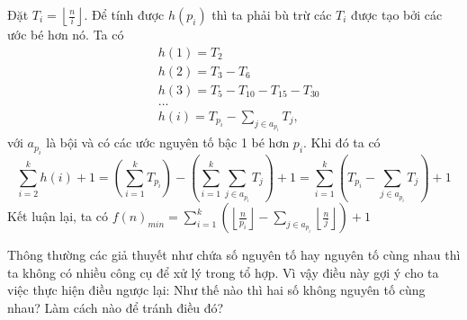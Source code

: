 \documentclass[11pt]{scrartcl}
\begin{document}
\begin{itemize}[label=, leftmargin=0em, itemsep=0.5em]
\begin{sol}
        Đặt $T_i= \left\lfloor \frac{n}{i } \right\rfloor$. Để tính được $h(p_i)$ thì ta phải bù trừ các $T_i$ được tạo bởi các ước bé hơn nó. Ta có
        \[
            \begin{aligned}
                &h(1) = T_2 \\
                &h(2) = T_3 - T_6\\
                &h(3) = T_5 - T_{10} - T_{15} - T_{30}\\
                &...\\
                &h(i) = T_{p_i} - \sum_{j \in a_{p_i}} T_j,
            \end{aligned}
        \]
        với $a_{p_i}$ là bội và có các ước nguyên tố bậc 1 bé hơn $p_i$. Khi đó ta có
        \[
            \sum_{i = 2}^k h(i) + 1 = \left(\sum_{i = 1}^k T_{p_i}\right) - \left(\sum_{i = 1}^k \sum_{j \in a_{p_i}} T_{j}\right) + 1 = \sum_{i = 1}^k\left( T_{p_i} - \sum_{j \in a_{p_i}} T_{j}\right) + 1
        \]
        Kết luận lại, ta có $\displaystyle f(n)_{min} = \sum_{i = 1}^k\left( \left\lfloor \frac{n}{p_i }\right\rfloor - \sum_{j \in a_{p_i}} \left\lfloor \frac{n}{j }\right\rfloor\right) + 1$
        
    \end{sol}
     Thông thường các giả thuyết như chứa số nguyên tố hay nguyên tố cùng nhau thì ta không có nhiều công cụ để xử lý trong tổ hợp. Vì vậy điều này gợi ý cho ta việc thực hiện điều ngược lại: Như thế nào thì hai số không nguyên tố cùng nhau? Làm cách nào để tránh điều đó?
   


\end{itemize}
\end{document}
